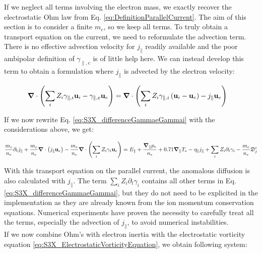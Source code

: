 If we neglect all terms involving the electron mass, we exactly recover the electrostatic Ohm law from Eq. \ref{eq:DefinitionParallelCurrent}. The aim of this section is to consider a finite $m_e$, so we keep all terms. To truly obtain a transport equation on the current, we need to reformulate the advection term. There is no effective advection velocity for $j_\parallel$ readily available and the poor ambipolar definition of $\gamma_{\parallel,e}$ is of little help here. We can instead develop this term to obtain a formulation where $j_\parallel$ is advected by the electron velocity:

\begin{align}
	\label{eq:S3X_advectionJPara}
	\grad\cdot\left(\sum_i Z_i\gamma_{\parallel,i}\mathbf{u}_i - \gamma_{\parallel,e}\mathbf{u}_e\right) &= \grad\cdot\left(\sum_i Z_i\gamma_{\parallel,i}\left(\mathbf{u}_i-\mathbf{u}_e\right) - j_\parallel\mathbf{u}_e\right)
\end{align}

If we now rewrite Eq. \ref{eq:S3X_differenceGammaeGammai} with the considerations above, we get: 

\begin{equation}
	\label{eq:S3X_OhmLawElectronInertia}
	\frac{m_e}{n_e}\partial_t j_\parallel + \frac{m_e}{n_e}\grad\cdot\left(j_\parallel\mathbf{u}_e\right)  - \frac{m_e}{n_e}\grad\cdot\left(\sum_i Z_i\gamma_i\mathbf{u}_e\right) = E_\parallel + \frac{\grad_\parallel p_e}{n_e} + 0.71\grad_\parallel T_e - \eta_\parallel j_\parallel + \sum_i Z_i \partial_t \gamma_i - \frac{m_e}{n_e}\mathfrak{D}_j^e
\end{equation}

With this transport equation on the parallel current, the anomalous diffusion is also calculated with $j_\parallel$. The term $\sum_i Z_i \partial_t \gamma_i$ contains all other terms in Eq. \ref{eq:S3X_differenceGammaeGammai}, but they do not need to be explicited in the implementation as they are already known from the ion momentum conservation equations. Numerical experiments have proven the necessity to carefully treat all the terms, especially the advection of $j_\parallel$, to avoid numerical instabilities. \\

If we now combine Ohm's with electron inertia with the electrostatic vorticity equation \ref{eq:S3X_ElectrostaticVorticityEquation}, we obtain following system:

